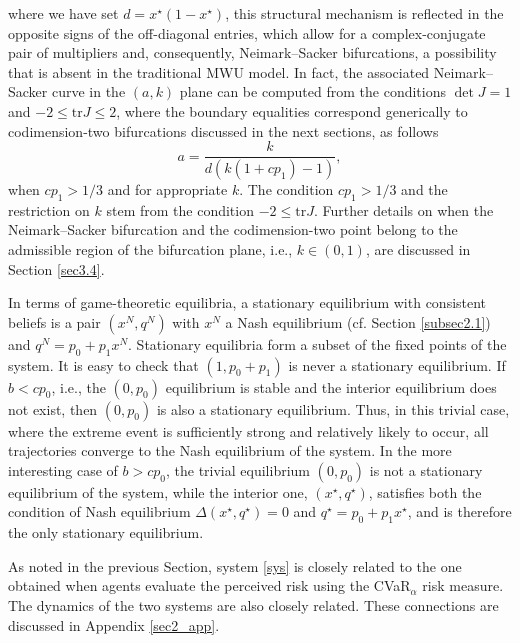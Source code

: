 \documentclass{article}
\theoremstyle{plain}
\theoremstyle{definition}
\begin{document}
where we have set $d=x^\star(1-x^\star)$, this structural mechanism is reflected in the opposite signs of the off-diagonal entries, which allow for a complex-conjugate pair of multipliers and, consequently, Neimark--Sacker bifurcations, a possibility that is absent in the traditional MWU model. In fact, the associated Neimark--Sacker curve in the $(a,k)$ plane can be computed from the conditions $\det J=1$ and $-2\leq \mathrm{tr}J\leq 2$, where the boundary equalities correspond generically to codimension-two bifurcations discussed in the next sections, as follows
\begin{equation}
a=\frac{k}{d\left(k(1+cp_1) -1\right)},
\label{NS_eq}
\end{equation}
when $cp_1>1/3$ and for appropriate $k.$ The condition $cp_1>1/3$ and the restriction on $k$ stem from the condition $-2\leq \mathrm{tr}J$. Further details on when the Neimark--Sacker bifurcation and the codimension-two point belong to the admissible region of the bifurcation plane, i.e., $k\in(0,1)$, are discussed in Section \ref{sec3.4}.

In terms of game-theoretic equilibria, 
a stationary equilibrium with consistent beliefs is a pair $(x^N,q^N)$ with $x^N$ a Nash equilibrium (cf. Section \ref{subsec2.1}) and $q^N=p_0+p_1x^N$. Stationary equilibria form a subset of the fixed points of the system. It is easy to check that $(1,p_0+p_1)$ is never a stationary equilibrium. If $b<cp_0$, i.e., the $(0,p_0)$ equilibrium is stable and the interior equilibrium does not exist, then $(0,p_0)$ is also a stationary equilibrium. Thus, in this trivial case, where the extreme event is sufficiently strong and relatively likely to occur, all trajectories converge to the Nash equilibrium of the system. In the more interesting case of $b>cp_0$, the trivial equilibrium $(0,p_0)$ is not a stationary equilibrium of the system, while the interior one, $(x^\star,q^\star)$, satisfies both the condition of Nash equilibrium $\Delta(x^\star, q^\star)=0$ and $q^\star=p_0+p_1x^\star$, and is therefore the only stationary equilibrium.

As noted in the previous Section, system \eqref{sys} is closely related to the one obtained when agents evaluate the perceived risk using the CVaR$_\alpha$ risk measure. The dynamics of the two systems are also closely related. These connections are discussed in Appendix \ref{sec2_app}. 
\end{document}
